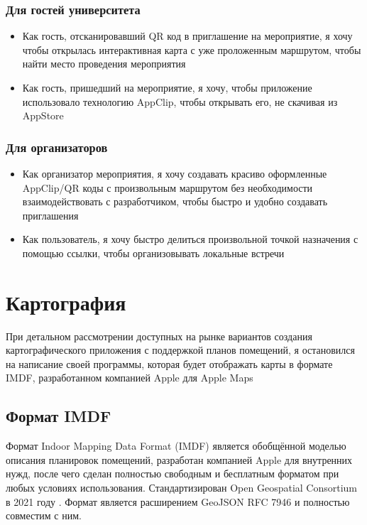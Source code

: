     \subsection{Для гостей университета}
      \begin{itemize}
        \item Как гость, отсканировавший QR код в приглашение на мероприятие, я хочу чтобы открылась интерактивная карта с уже проложенным маршрутом, чтобы найти место проведения мероприятия
        \item Как гость, пришедший на мероприятие, я хочу, чтобы приложение использовало технологию AppClip, чтобы открывать его, не скачивая из AppStore
      \end{itemize}
    \subsection{Для организаторов}
      \begin{itemize}
        \item Как организатор мероприятия, я хочу создавать красиво оформленные AppClip/QR коды с произвольным маршрутом без необходимости взаимодействовать с разработчиком, чтобы быстро и удобно создавать приглашения
        \item Как пользователь, я хочу быстро делиться произвольной точкой назначения с помощью ссылки, чтобы организовывать локальные встречи
      \end{itemize}

\chapter{Картография}
  При детальном рассмотрении доступных на рынке вариантов создания картографического приложения с поддержкой планов помещений, я остановился на написание своей программы, которая будет отображать карты в формате IMDF, разработанном компанией Apple для Apple Maps
  \section{Формат IMDF}
    Формат Indoor Mapping Data Format (IMDF) \cite{IMDF} является обобщённой моделью описания планировок помещений, разработан компанией Apple для внутренних нужд, после чего сделан полностью свободным и бесплатным форматом при любых условиях использования. Стандартизирован Open Geospatial Consortium в 2021 году \cite{IMDFOGC}. Формат является расширением GeoJSON RFC 7946 \cite{GeoJSON-RFC-7946} и полностью совместим с ним.

